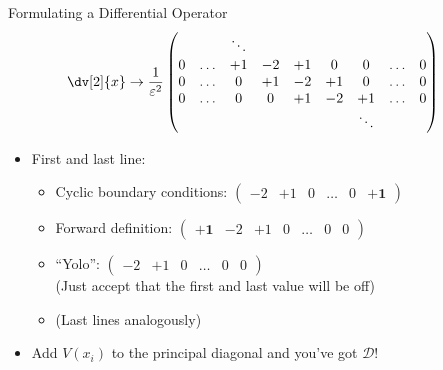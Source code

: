 \begin{frame}{Formulating a Differential Operator}
%
\vspace{-6pt}
\begin{align*}
	\dv[2]{x}
&\to
	\dfrac{1}{\varepsilon^2}
	\begin{pmatrix}
		&&\ddots \\
		0 & \ldots & +1 & -2 & +1 & 0 & 0 & \ldots & 0 \\
		0 & \ldots & 0 & +1 & -2 & +1 & 0 & \ldots & 0 \\
		0 & \ldots & 0 & 0 & +1 & -2 & +1 & \ldots & 0 \\
		&&&&&&\ddots 
	\end{pmatrix}
\end{align*}
%
\vspace{-3pt}
\begin{itemize}
\item First and last line:
	\begin{itemize}
	\item Cyclic boundary conditions: $
		\begin{pmatrix}
		-2 & +1 & 0 & \ldots & 0 & \mathbf{+1}
		\end{pmatrix}
		$
	\item Forward definition: $
		\begin{pmatrix}
		\mathbf{+1} & -2 & +1 & 0 & \ldots & 0 & 0
		\end{pmatrix}
		$
	\item \enquote{Yolo}: $
		\begin{pmatrix}
		-2 & +1 & 0 & \ldots & 0 & 0
		\end{pmatrix}
		$ \\
		(Just accept that the first and last value will be off)
	\item (Last lines analogously)
	\end{itemize}
	\item Add $V(x_i)$ to the principal diagonal and you've got $\mathcal{D}$!
\end{itemize}
%
\end{frame}


